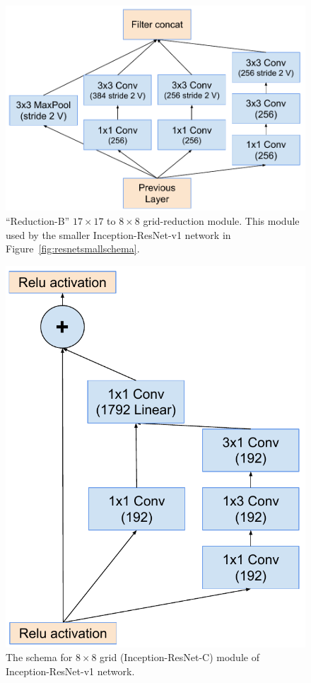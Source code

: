 \begin{figure}
\centering
\includegraphics[width=\linewidth]{reductionto8resnet}
\caption{``Reduction-B'' $17\times 17$ to $8\times 8$ grid-reduction module.
  This module used by the smaller Inception-ResNet-v1 network
  in Figure~\ref{fig:resnetsmallschema}.
}
\label{fig:reductionto8resnet}
\end{figure}
\begin{figure}
\centering
\includegraphics[width=\linewidth]{resnetsmall8x8}
\caption{The schema for $8\times 8$ grid (Inception-ResNet-C) module of Inception-ResNet-v1
 network.}
\label{fig:resnetsmall8x8module}
\end{figure}
